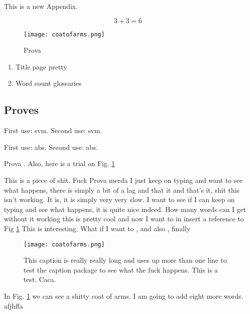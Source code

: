 
This is a new Appendix.

\begin{equation}
3+3 = 6
\end{equation}

\begin{figure}[htbp]
\begin{center}
\texttt{[image: coatofarms.png]}
\caption{Prova}
\end{center}
\end{figure}

\begin{enumerate}

\item Title page pretty

\item Word count glossaries

\end{enumerate}


\subsection{Proves}

First use: \gls{svm}. Second use: \gls{svm}.

First use: \gls{abs}. Second use: \gls{abs}.

Prova \cite{mike}. Also, here is a trial on Fig. \ref{caca}


This is a piece of shit. Fuck Prova merda I just keep on typing and want to see what happens, there is simply a bit of a lag and that it and that's it, shit this isn't working. It is, it is simply very very slow. I want to see if I can keep on typing and see what happens, it is quite nice indeed. How many words can I get without it working this is pretty cool and now I want to in insert a reference to Fig \ref{caca} This is interesting. What if I want to \cite{mike}, and also \cite{mierda}, finally \cite{Nelder1965}

\begin{figure}[htbp]
\begin{center}
\texttt{[image: coatofarms.png]}
\caption{This caption is really really long and uses up more than one line to test the caption package to see what the fuck happens. This is a test. Caca.}
\label{caca}
\end{center}
\end{figure}


In Fig. \ref{caca} we can see a shitty coat of arms. I am going to add eight more words. afjhffa

